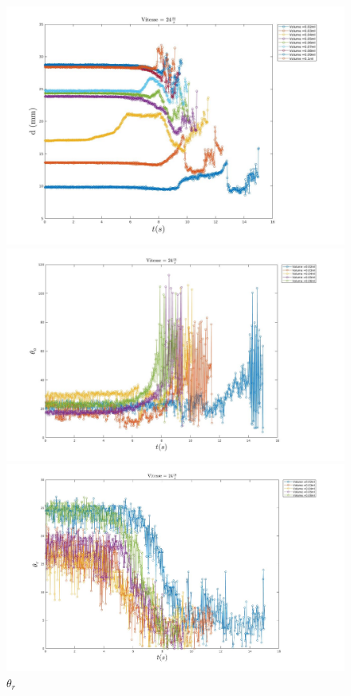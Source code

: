 \begin{figure}[!h]
	\begin{minipage}{0.95\linewidth}
	\includegraphics[width = \linewidth]{./image/v=24d.jpg}
	\caption{$d$}
	\end{minipage}
	\begin{minipage}{0.95\linewidth}
	\includegraphics[width = \linewidth]{./image/v=24oa_2.jpg}
	\caption{$\theta_{a}$}
	\end{minipage}
	\begin{minipage}{0.95\linewidth}
	\includegraphics[width = \linewidth]{./image/v=24or_2.jpg}
	\caption{$\theta_{r}$}
	\end{minipage}
\end{figure}

